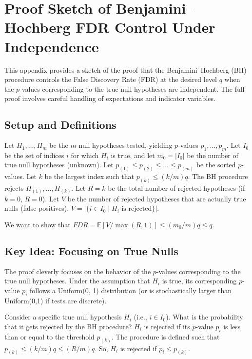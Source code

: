 \documentclass[12pt]{book}
\newcommand{\E}{\mathbb{E}}              %
\newcommand{\FDR}{{FDR}}    %
\newcommand{\pvalue}{$p$-value}          %
\begin{document}
\appendix

\chapter{Proof Sketch of Benjamini–Hochberg FDR Control Under Independence}
\label{appendix:BHproof}

This appendix provides a sketch of the proof that the Benjamini–Hochberg (BH) procedure controls the False Discovery Rate (FDR) at the desired level $q$ when the \pvalue s corresponding to the true null hypotheses are independent. The full proof involves careful handling of expectations and indicator variables.

\section{Setup and Definitions}
Let $H_1, \dots, H_m$ be the $m$ null hypotheses tested, yielding \pvalue s $p_1, \dots, p_m$.
Let $I_0$ be the set of indices $i$ for which $H_i$ is true, and let $m_0 = |I_0|$ be the number of true null hypotheses (unknown).
Let $p_{(1)} \le p_{(2)} \le \dots \le p_{(m)}$ be the sorted \pvalue s.
Let $k$ be the largest index such that $p_{(k)} \le (k/m)q$. The BH procedure rejects $H_{(1)}, \dots, H_{(k)}$.
Let $R = k$ be the total number of rejected hypotheses (if $k=0$, $R=0$).
Let $V$ be the number of rejected hypotheses that are actually true nulls (false positives). $V = |\{ i \in I_0 \mid H_i \text{ is rejected} \}|$.

We want to show that $\FDR = \E[V / \max(R, 1)] \le (m_0/m)q \le q$.

\section{Key Idea: Focusing on True Nulls}
The proof cleverly focuses on the behavior of the \pvalue s corresponding to the true null hypotheses. Under the assumption that $H_i$ is true, its corresponding \pvalue{} $p_i$ follows a Uniform(0, 1) distribution (or is stochastically larger than Uniform(0,1) if tests are discrete).

Consider a specific true null hypothesis $H_i$ (i.e., $i \in I_0$). What is the probability that it gets rejected by the BH procedure? $H_i$ is rejected if its \pvalue{} $p_i$ is less than or equal to the threshold $p_{(k)}$. The procedure is defined such that $p_{(k)} \le (k/m)q \le (R/m)q$.
So, $H_i$ is rejected if $p_i \le p_{(k)}$.
\end{document}
